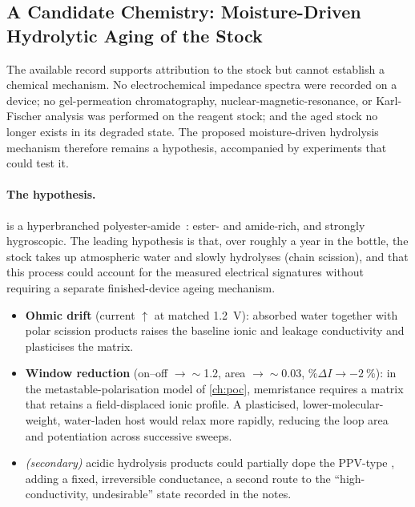 \documentclass[12pt, twoside]{report}
\begin{document}
\subsection{A Candidate Chemistry: Moisture-Driven Hydrolytic Aging of the \Hybrane{} Stock}\label{subsec:bridge_hypothesis}

The available record supports attribution to the stock but cannot establish a chemical mechanism. No electrochemical impedance spectra were recorded on a \Hybrane{} device; no gel-permeation chromatography, nuclear-magnetic-resonance, or Karl-Fischer analysis was performed on the reagent stock; and the aged stock no longer exists in its degraded state. The proposed moisture-driven hydrolysis mechanism therefore remains a hypothesis, accompanied by experiments that could test it.

\paragraph{The hypothesis.} \Hybrane{} is a hyperbranched polyester-amide~\cite{Froehling2004,VoitLederer2009}: ester- and amide-rich, and strongly hygroscopic. The leading hypothesis is that, over roughly a year in the bottle, the stock takes up atmospheric water and slowly hydrolyses (chain scission), and that this process could account for the measured electrical signatures without requiring a separate finished-device ageing mechanism.
\begin{itemize}
  \item \textbf{Ohmic drift} (current $\uparrow$ at matched \SI{1.2}{\volt}): absorbed water together with polar scission products raises the baseline ionic and leakage conductivity and plasticises the matrix.
  \item \textbf{Window reduction} (on--off $\to\sim$\num{1.2}, area $\to\sim$\num{0.03}, $\%\Delta I\to-\SI{2}{\percent}$): in the metastable-polarisation model of \cref{ch:poc}, memristance requires a matrix that retains a field-displaced ionic profile. A plasticised, lower-molecular-weight, water-laden host would relax more rapidly, reducing the loop area and potentiation across successive sweeps.
  \item \emph{(secondary)} acidic hydrolysis products could partially dope the PPV-type \SY{}, adding a fixed, irreversible conductance, a second route to the ``high-conductivity, undesirable'' state recorded in the notes.
\end{itemize}
\end{document}
